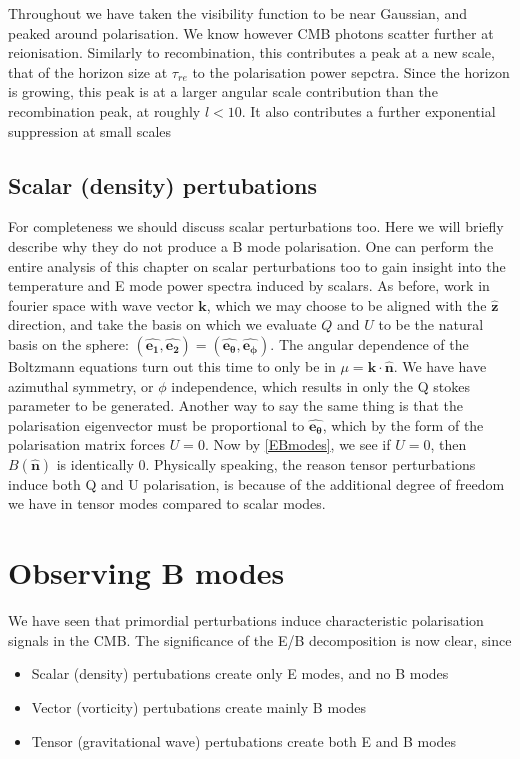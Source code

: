 \documentclass[a4paper,10pt]{article}
\renewcommand{\v}[1]{\mathbf{#1}}
\newcommand{\unit}[1]{\hat{\v{#1}}}
\begin{document}
Throughout we have taken the visibility function to be near Gaussian, and peaked around polarisation. We know however CMB photons scatter further at reionisation. Similarly to recombination, this contributes a peak at a new scale, that of the horizon size at $\tau_{re}$ to the polarisation power sepctra. Since the horizon is growing, this peak is at a larger angular scale contribution than the recombination peak, at roughly $l<10$. It also contributes a further exponential suppression  at small scales \cite{reionisation2}



\subsection{Scalar (density) pertubations}

For completeness we should discuss scalar perturbations too. Here we will briefly describe why they do not produce a B mode polarisation. One can perform the entire analysis of this chapter on scalar perturbations too to gain insight into the temperature and E mode power spectra induced by scalars. As before, work in fourier space with wave vector $\v{k}$, which we may choose to be aligned with the $\unit{z}$ direction, and take the basis on which we evaluate $Q$ and $U$ to be the natural basis on the sphere: $(\unit{e_1}, \unit{e_2}) = (\unit{e_\theta}, \unit{e_\phi})$. The angular dependence of the Boltzmann equations turn out this time to only be in $\mu=\v{k}\cdot\unit{n}$. We have have azimuthal symmetry, or $\phi$ independence, which results in only the Q stokes parameter to be generated. Another way to say the same thing is that the polarisation eigenvector must be proportional to $\unit{e_\theta}$, which by the form of the polarisation matrix forces $U=0$. Now by \ref{EBmodes}, we see if $U=0$, then $B(\unit{n})$ is identically 0. Physically speaking, the reason tensor perturbations induce both Q and U polarisation, is because of the additional degree of freedom we have in tensor modes compared to scalar modes.


\section{Observing B modes}


We have seen that primordial perturbations induce characteristic polarisation signals in the CMB. The significance of the E/B decomposition is now clear, since

\begin{itemize}
\item Scalar (density) pertubations create only E modes, and no B modes
\item Vector (vorticity) pertubations create mainly B modes
\item Tensor (gravitational wave) pertubations create both E and B modes
\end{itemize}
\end{document}
